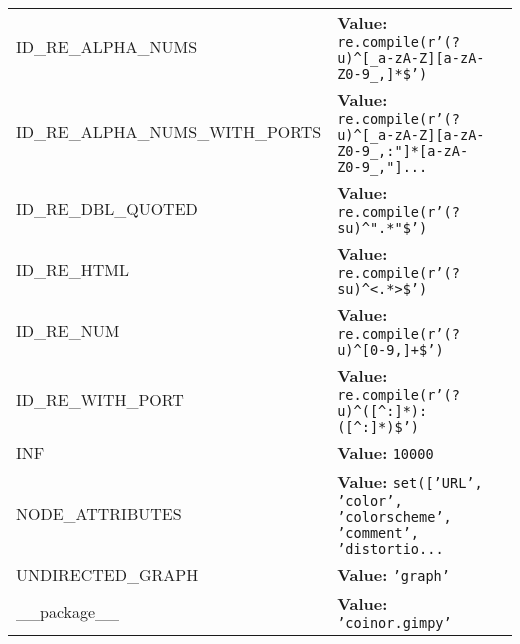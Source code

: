 \begin{longtable}{|p{\varnamewidth}|p{\vardescrwidth}|l}
\raggedright I\-D\-\_\-R\-E\-\_\-A\-L\-P\-H\-A\-\_\-N\-U\-M\-S\- & \raggedright \textbf{Value:} 
{\tt re.compile(r'\texttt{(?u)}{\textasciicircum}\texttt{[}\_a\texttt{-}zA\texttt{-}Z\texttt{]}\texttt{[}a\texttt{-}zA\texttt{-}Z0\texttt{-}9\_,\texttt{]}\texttt{*}\$')}&\\
\cline{1-2}
\raggedright I\-D\-\_\-R\-E\-\_\-A\-L\-P\-H\-A\-\_\-N\-U\-M\-S\-\_\-W\-I\-T\-H\-\_\-P\-O\-R\-T\-S\- & \raggedright \textbf{Value:} 
{\tt re.compile(r'\texttt{(?u)}{\textasciicircum}\texttt{[}\_a\texttt{-}zA\texttt{-}Z\texttt{]}\texttt{[}a\texttt{-}zA\texttt{-}Z0\texttt{-}9\_,:"\texttt{]}\texttt{*}\texttt{[}a\texttt{-}zA\texttt{-}Z0\texttt{-}9\_,"\texttt{]}\texttt{...}}&\\
\cline{1-2}
\raggedright I\-D\-\_\-R\-E\-\_\-D\-B\-L\-\_\-Q\-U\-O\-T\-E\-D\- & \raggedright \textbf{Value:} 
{\tt re.compile(r'\texttt{(?su)}{\textasciicircum}".\texttt{*}"\$')}&\\
\cline{1-2}
\raggedright I\-D\-\_\-R\-E\-\_\-H\-T\-M\-L\- & \raggedright \textbf{Value:} 
{\tt re.compile(r'\texttt{(?su)}{\textasciicircum}{\textless}.\texttt{*}{\textgreater}\$')}&\\
\cline{1-2}
\raggedright I\-D\-\_\-R\-E\-\_\-N\-U\-M\- & \raggedright \textbf{Value:} 
{\tt re.compile(r'\texttt{(?u)}{\textasciicircum}\texttt{[}0\texttt{-}9,\texttt{]}\texttt{+}\$')}&\\
\cline{1-2}
\raggedright I\-D\-\_\-R\-E\-\_\-W\-I\-T\-H\-\_\-P\-O\-R\-T\- & \raggedright \textbf{Value:} 
{\tt re.compile(r'\texttt{(?u)}{\textasciicircum}\texttt{(}\texttt{[{\textasciicircum}}:\texttt{]}\texttt{*}\texttt{)}:\texttt{(}\texttt{[{\textasciicircum}}:\texttt{]}\texttt{*}\texttt{)}\$')}&\\
\cline{1-2}
\raggedright I\-N\-F\- & \raggedright \textbf{Value:} 
{\tt 10000}&\\
\cline{1-2}
\raggedright N\-O\-D\-E\-\_\-A\-T\-T\-R\-I\-B\-U\-T\-E\-S\- & \raggedright \textbf{Value:} 
{\tt \texttt{set([}\texttt{'}\texttt{URL}\texttt{'}\texttt{, }\texttt{'}\texttt{color}\texttt{'}\texttt{, }\texttt{'}\texttt{colorscheme}\texttt{'}\texttt{, }\texttt{'}\texttt{comment}\texttt{'}\texttt{, }\texttt{'}\texttt{distortio}\texttt{...}}&\\
\cline{1-2}
\raggedright U\-N\-D\-I\-R\-E\-C\-T\-E\-D\-\_\-G\-R\-A\-P\-H\- & \raggedright \textbf{Value:} 
{\tt \texttt{'}\texttt{graph}\texttt{'}}&\\
\cline{1-2}
\raggedright \_\-\_\-p\-a\-c\-k\-a\-g\-e\-\_\-\_\- & \raggedright \textbf{Value:} 
{\tt \texttt{'}\texttt{coinor.gimpy}\texttt{'}}&\\
\cline{1-2}
\end{longtable}


